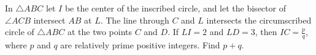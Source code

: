 In $\triangle ABC$ let $I$ be the center of the inscribed circle, and let the bisector of $\angle ACB$ intersect $AB$ at $L$. The line through $C$ and $L$ intersects the circumscribed circle of $\triangle ABC$ at the two points $C$ and $D$. If $LI = 2$ and $LD = 3$,  then $IC = \tfrac{p}{q}$,  where $p$ and $q$ are relatively prime positive integers. Find $p + q$.